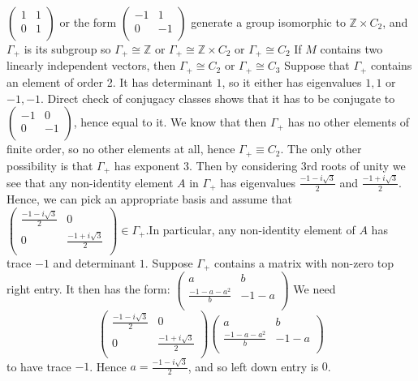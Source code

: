 \documentclass[a4paper]{article}
\begin{document}
$\begin{pmatrix}
1 & 1 \\ 
0 & 1 \\
\end{pmatrix}$ or the form 
$\begin{pmatrix}
-1 & 1 \\
0 & -1 \\
\end{pmatrix}$ generate a group isomorphic to $\mathbb{Z} \times C_2$, and $\Gamma_+$ is its subgroup so $\Gamma_+ \cong \mathbb{Z}$ or $\Gamma_+ \cong \mathbb{Z} \times C_2$ or $\Gamma_+ \cong C_2$
\clm If $M$ contains two linearly independent vectors, then $\Gamma_+ \cong C_2$ or $\Gamma_+ \cong C_3$
Suppose that $\Gamma_+$ contains an element of order 2. It has determinant $1$, so it either has eigenvalues $1, 1$ or $-1, -1$. Direct check of conjugacy classes shows that it has to be conjugate to $\begin{pmatrix}
-1 & 0 \\ 
0 & -1 \\
\end{pmatrix}$, hence equal to it. We know that then $\Gamma_+$ has no other elements of finite order, so no other elements at all, hence $\Gamma_+ \equiv C_2$.
The only other possibility is that $\Gamma_+$ has exponent 3. Then by considering 3rd roots of unity we see that any non-identity element $A$ in $\Gamma_+$ has eigenvalues $\frac{-1-i\sqrt{3}}{2}$ and $\frac{-1+i\sqrt{3}}{2}$. Hence, we can pick an appropriate basis and assume that $\begin{pmatrix}
\frac{-1-i\sqrt{3}}{2} & 0 \\ 
0 &  \frac{-1+i\sqrt{3}}{2}\\
\end{pmatrix} \in \Gamma_+$.In particular, any non-identity element of $A$ has trace $-1$ and determinant $1$. Suppose $\Gamma_+$ contains a matrix with non-zero top right entry. It then has the form:
$\begin{pmatrix}
a & b \\ 
\frac{-1-a-a^2}{b} & -1-a \\
\end{pmatrix}$ 
We need 
$$\begin{pmatrix}
\frac{-1-i\sqrt{3}}{2} & 0 \\ 
0 &  \frac{-1+i\sqrt{3}}{2}\\
\end{pmatrix} \begin{pmatrix}
	a & b \\ 
	\frac{-1-a-a^2}{b} & -1-a \\
\end{pmatrix}$$ to have trace $-1$. Hence $a = \frac{-1-i\sqrt{3}}{2}$, and so left down entry is $0$. 
\end{document}
